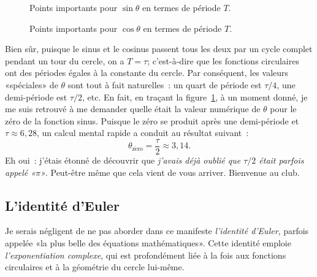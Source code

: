 \begin{figure}
\begin{center}
\end{center}
\caption{Points importants pour $\sin\theta$ en termes de période
$T$.\label{fig:sine_with_tau}}
\end{figure}

\begin{figure}
\begin{center}
\end{center}
\caption{Points importants pour $\cos\theta$ en termes de période
$T$.\label{fig:cosine_with_tau}}
\end{figure}

Bien sûr, puisque le sinus et le cosinus passent tous les deux par un cycle
complet pendant un tour du cercle, on a $T = \tau$\ns; c'est-à-dire que les
fonctions circulaires ont des périodes égales à la constante du cercle. Par
conséquent, les valeurs «\ns spéciales\ns »  de $\theta$ sont tout à fait
naturelles~: un quart de période est $\tau/4$, une demi-période est $\tau/2$,
etc. En fait, en traçant la figure~\ref{fig:sine_with_tau}, à un moment donné,
je me suis retrouvé à me demander quelle était la valeur numérique de $\theta$
pour le zéro de la fonction sinus. Puisque le zéro se produit après une
demi-période et $\tau \approx 6{,}28$, un calcul mental rapide a
conduit au résultat suivant~:
\[
  \theta_\mathrm{z\acute{e}ro} = \frac{\tau}{2} \approx 3{,}14.
\]
Eh oui~: j'étais étonné de découvrir que \emph{j'avais déjà oublié que
$\tau/2$ était parfois appelé «\ns $\pi$\ns »}. Peut-être même que cela vient de vous
arriver. Bienvenue au club.



   \subsection{L'identité d'Euler} %
   \label{sec:euler_s_identity}

Je serais négligent de ne pas aborder dans ce manifeste \emph{l'identité
d'Euler}, parfois appelée «\ns la plus belle des équations mathématiques\ns ». Cette
identité emploie \emph{l'exponentiation complexe}, qui est profondément liée à
la fois aux fonctions circulaires et à la géométrie du cercle lui-même.

